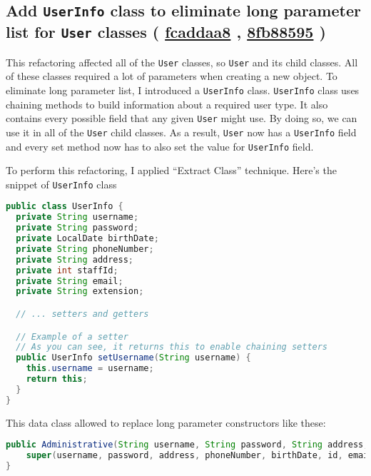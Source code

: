 \documentclass{article}
\newcommand{\code}[1]{\texttt{#1}}
\newcommand{\gh}[1]{%
  \href{https://github.com/awave1/assessment-loan-system/commit/#1}{#1}%
}
\begin{document}
\subsection*{Add \code{UserInfo} class to eliminate long parameter list for \code{User} classes (\gh{fcaddaa8}, \gh{8fb88595})}
This refactoring affected all of the \code{User} classes, so \code{User} and its child classes. All of these classes required a lot of parameters when creating a new object. To eliminate long parameter list, I introduced a \code{UserInfo} class. \code{UserInfo} class uses chaining methods to build information about a required user type. It also contains every possible field that any given \code{User} might use. By doing so, we can use it in all of the \code{User} child classes. As a result, \code{User} now has a \code{UserInfo} field and every set method now has to also set the value for \code{UserInfo} field.

To perform this refactoring, I applied ``Extract Class'' technique. Here's the snippet of \code{UserInfo} class

\begin{lstlisting}[language=Java]
public class UserInfo {
  private String username;
  private String password;
  private LocalDate birthDate;
  private String phoneNumber;
  private String address;
  private int staffId;
  private String email;
  private String extension;

  // ... setters and getters

  // Example of a setter
  // As you can see, it returns this to enable chaining setters
  public UserInfo setUsername(String username) {
    this.username = username;
    return this;
  }
}
\end{lstlisting}

\noindent This data class allowed to replace long parameter constructors like these:

\begin{lstlisting}[language=Java]
public Administrative(String username, String password, String address, String phoneNumber, LocalDate birthDate, int id, String email, String extension) {
    super(username, password, address, phoneNumber, birthDate, id, email, extension);
}
\end{lstlisting}
\end{document}
